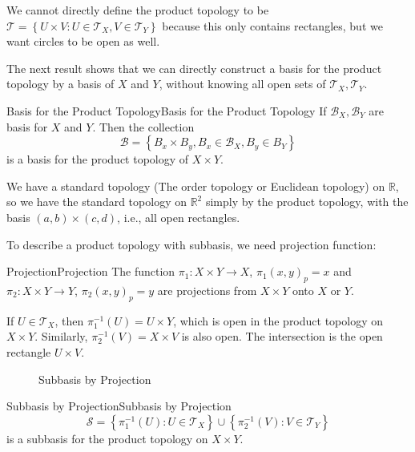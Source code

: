 \documentclass[../main.tex]{subfiles}
\begin{document}
\begin{remark}
We cannot directly define  the product topology to be $\mathcal{T} = \left\{ U \times V: U\in \mathcal{T}_X, V\in \mathcal{T}_Y \right\}$ because this only contains rectangles, but we want circles to be open as well.
\end{remark}

The next result shows that we can directly construct a basis for the product topology by a basis of $X$ and $Y$, without knowing all open sets of $\mathcal{T}_X,\mathcal{T}_Y$.

\begin{theorem}{Basis for the Product Topology}{Basis for the Product Topology}
If $\mathcal{B}_X,\mathcal{B}_Y$ are basis for $X$ and $Y$. Then the collection
\begin{equation*}
	\mathcal{B} = \left\{ B_x \times B_y, B_x\in \mathcal{B}_X, B_y\in B_Y \right\}
\end{equation*}
is a basis for the product topology of $X \times Y$.
\end{theorem}

\begin{remark}
We have a standard topology (The order topology or Euclidean topology) on $\mathbb{R}$, so we have the standard topology on $\mathbb{R}^2$ simply by the product topology, with the basis $(a,b) \times (c,d)$, i.e., all open rectangles.
\end{remark}

To describe a product topology with subbasis, we need projection function:

\begin{definition}{Projection}{Projection}
	The function $\pi_1: X \times Y \rightarrow X$, $\pi_1(x,y)_p = x$ and $\pi_2: X \times Y \rightarrow Y$, $\pi_2(x,y)_p = y$ are projections from $X \times Y$ onto $X$ or $Y$.
\end{definition}

If $U\in \mathcal{T}_X$, then $\pi_1^{-1}(U) = U \times Y$, which is open in the product topology on $X \times Y$. Similarly, $\pi_2^{-1}(V) = X \times V$ is also open. The intersection is the open rectangle $U \times V$.

\begin{figure}[ht]
    \centering
    \caption{Subbasis by Projection}
    \label{fig:subbasis-by-projection}
\end{figure}

\begin{theorem}{Subbasis by Projection}{Subbasis by Projection}
\begin{equation*}
\mathcal{S} = \left\{ \pi_1^{-1}(U): U\in \mathcal{T}_X \right\} \cup \left\{ \pi_2^{-1}(V): V\in \mathcal{T}_Y \right\}
\end{equation*}
is a subbasis for the product topology on $X \times Y$.
\end{theorem}
\end{document}
